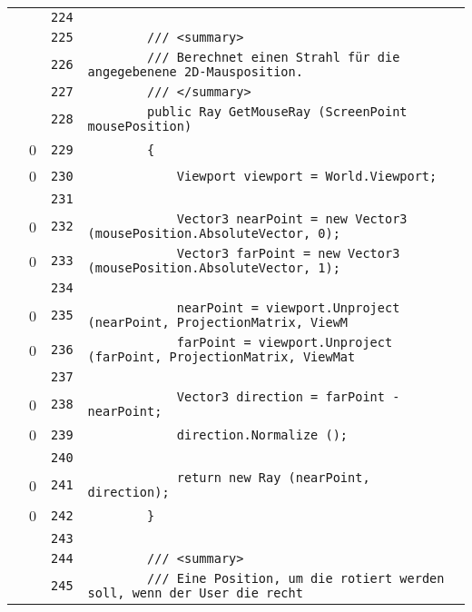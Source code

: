 \documentclass[a4paper,10pt]{article}
\begin{document}
\begin{longtable}[l]{lrrl}
\cellcolor{gray} &  & \verb~224~ & \verb~~\\
\cellcolor{gray} &  & \verb~225~ & \verb~        /// <summary>~\\
\cellcolor{gray} &  & \verb~226~ & \verb~        /// Berechnet einen Strahl für die angegebenene 2D-Mausposition.~\\
\cellcolor{gray} &  & \verb~227~ & \verb~        /// </summary>~\\
\cellcolor{gray} &  & \verb~228~ & \verb~        public Ray GetMouseRay (ScreenPoint mousePosition)~\\
\cellcolor{red} & 0 & \verb~229~ & \verb~        {~\\
\cellcolor{red} & 0 & \verb~230~ & \verb~            Viewport viewport = World.Viewport;~\\
\cellcolor{gray} &  & \verb~231~ & \verb~~\\
\cellcolor{red} & 0 & \verb~232~ & \verb~            Vector3 nearPoint = new Vector3 (mousePosition.AbsoluteVector, 0);~\\
\cellcolor{red} & 0 & \verb~233~ & \verb~            Vector3 farPoint = new Vector3 (mousePosition.AbsoluteVector, 1);~\\
\cellcolor{gray} &  & \verb~234~ & \verb~~\\
\cellcolor{red} & 0 & \verb~235~ & \verb~            nearPoint = viewport.Unproject (nearPoint, ProjectionMatrix, ViewM~\\
\cellcolor{red} & 0 & \verb~236~ & \verb~            farPoint = viewport.Unproject (farPoint, ProjectionMatrix, ViewMat~\\
\cellcolor{gray} &  & \verb~237~ & \verb~~\\
\cellcolor{red} & 0 & \verb~238~ & \verb~            Vector3 direction = farPoint - nearPoint;~\\
\cellcolor{red} & 0 & \verb~239~ & \verb~            direction.Normalize ();~\\
\cellcolor{gray} &  & \verb~240~ & \verb~~\\
\cellcolor{red} & 0 & \verb~241~ & \verb~            return new Ray (nearPoint, direction);~\\
\cellcolor{red} & 0 & \verb~242~ & \verb~        }~\\
\cellcolor{gray} &  & \verb~243~ & \verb~~\\
\cellcolor{gray} &  & \verb~244~ & \verb~        /// <summary>~\\
\cellcolor{gray} &  & \verb~245~ & \verb~        /// Eine Position, um die rotiert werden soll, wenn der User die recht~\\

\end{longtable}
\end{document}
